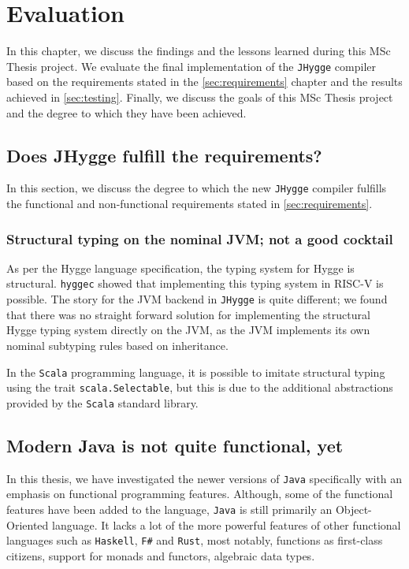 \chapter{Evaluation}

In this chapter, we discuss the findings and the lessons learned during this MSc Thesis project. We evaluate the final implementation
of the \texttt{JHygge} compiler based on the requirements stated in the \ref{sec:requirements} chapter and the results achieved in
\ref{sec:testing}. Finally, we discuss the goals of this MSc Thesis project and the degree to which they have been achieved.

\section{Does JHygge fulfill the requirements?}

In this section, we discuss the degree to which the new \texttt{JHygge} compiler fulfills the functional and non-functional requirements
stated in \ref{sec:requirements}.

\subsection{Structural typing on the nominal JVM; not a good cocktail}

As per the Hygge language specification, the typing system for Hygge is structural. \texttt{hyggec} showed that implementing this typing system
in RISC-V is possible. The story for the JVM backend in \texttt{JHygge} is quite different; we found that there was no straight forward solution
for implementing the structural Hygge typing system directly on the JVM, as the JVM implements its own nominal subtyping rules based on inheritance.

In the \texttt{Scala} programming language, it is possible to imitate structural typing using the trait \texttt{scala.Selectable}, but this is
due to the additional abstractions provided by the \texttt{Scala} standard library.

\section{Modern Java is not quite functional, yet}

In this thesis, we have investigated the newer versions of \texttt{Java} specifically with an emphasis on functional programming features.
Although, some of the functional features have been added to the language, \texttt{Java} is still primarily an Object-Oriented language.
It lacks a lot of the more powerful features of other functional languages such as \texttt{Haskell}, \texttt{F\#} and \texttt{Rust},
most notably, functions as first-class citizens, support for monads and functors, algebraic data types.

